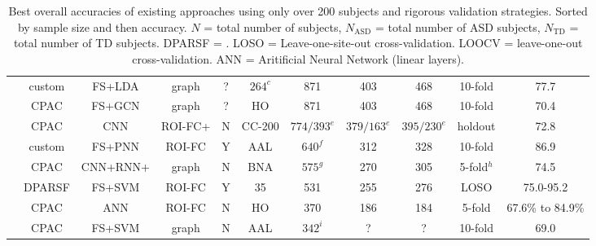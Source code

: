 \documentclass[10pt]{article}
\begin{document}
\begin{landscape}
\begin{table}
\begin{tabular}{lcccccccccc}
    \citeauthor{mostafaDiagnosisAutismSpectrum2019}                    &  custom  & FS+LDA &  graph   &   ?    & \(264^c\)  &  871  &  403  &  468  &  10-fold   &       77.7       \\
    \citeauthor{parisotDiseasePredictionUsing2018}                     &   CPAC   & FS+GCN &  graph   &   ?    &     HO     &  871  &  403  &  468  &  10-fold   &       70.4       \\
    \citeauthor{khoslaEnsembleLearning3D2019}                          &   CPAC   &  CNN   &  ROI-FC+ &   N    &   CC-200  &\(774/393^e\)&\(379/163^e\)&\(395/230^e\)&holdout& 72.8 \\
    \citeauthor{iidakaRestingStateFunctional2015}                      &  custom  & FS+PNN &  ROI-FC  &   Y    &     AAL   &\(640^f\)& 312  &  328  &  10-fold   &       86.9       \\
    \citeauthor{byeonArtificialNeuralNetwork2020}                      &   CPAC  & CNN+RNN+ & graph   &   N    &     BNA    &\(575^g\)& 270 &  305  & 5-fold\(^h\)&       74.5      \\
    \citeauthor{wangFunctionalConnectivitybasedClassification2019}     &  DPARSF  & FS+SVM &  ROI-FC  &   Y    &     35     &  531  &  255  &  276  &   LOSO    &      75.0-95.2    \\
    \citeauthor{liMultisiteFMRIAnalysis2020}                           &   CPAC   &  ANN   &  ROI-FC  &   N    &     HO     &  370  &  186  &  184  &   5-fold   & 67.6\% to 84.9\% \\
    \citeauthor{kazeminejadTopologicalPropertiesRestingState2019}      &   CPAC   & FS+SVM &  graph   &   N    &     AAL   &\(342^i\)&  ?   &   ?   &  10-fold   &       69.0       \\
    \bottomrule
  \end{tabular} \label{tab:existing-attempts}
  \caption{
    Best overall accuracies of existing approaches using only over 200 subjects and rigorous validation strategies. Sorted by sample size and then accuracy.
    \(N\) = total number of subjects,
    \(N_{\text{ASD}}\) = total number of ASD subjects,
    \(N_{\text{TD}}\) = total number of TD subjects.
    DPARSF = \citep[see][]{yanDPARSFMATLABToolbox2010}.
    LOSO = Leave-one-site-out cross-validation.
    LOOCV = leave-one-out cross-validation.
    ANN = Aritificial Neural Network (linear layers).
}
\end{table}
\end{landscape}
\end{document}
